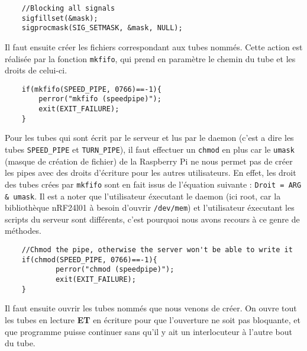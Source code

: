 \begin{DDbox}{\linewidth}
\begin{lstlisting}
	//Blocking all signals
	sigfillset(&mask);
	sigprocmask(SIG_SETMASK, &mask, NULL);
\end{lstlisting}
\end{DDbox}

Il faut ensuite créer les fichiers correspondant aux tubes nommés. Cette action
est réalisée par la fonction \texttt{mkfifo}, qui prend en paramètre le chemin
du tube et les droits de celui-ci. \\

\begin{DDbox}{\linewidth}
\begin{lstlisting}
	if(mkfifo(SPEED_PIPE, 0766)==-1){
		perror("mkfifo (speedpipe)");
		exit(EXIT_FAILURE);
	}
\end{lstlisting}
\end{DDbox}

Pour les tubes qui sont écrit par le serveur et lus par le daemon (c'est a dire
les tubes \texttt{SPEED\_PIPE} et \texttt{TURN\_PIPE}), il faut effectuer un 
\texttt{chmod} en plus car le \texttt{umask} (masque de création de fichier) 
de la Raspberry Pi ne nous permet pas de créer les pipes avec des droits 
d'écriture pour les autres utilisateurs. En effet, les droit des tubes 
crées par \texttt{mkfifo} sont en fait issus de l'équation suivante : 
\texttt{Droit = ARG \& umask}. Il est a noter que l'utilisateur éxecutant le 
daemon (ici root, car la bibliothèque nRF24l01 à besoin d'ouvrir
\texttt{/dev/mem}) et l'utilisateur éxecutant les scripts du serveur sont
différents, c'est pourquoi nous avons recours à ce genre de méthodes. \\

\begin{DDbox}{\linewidth}
\begin{lstlisting}
	//Chmod the pipe, otherwise the server won't be able to write it
	if(chmod(SPEED_PIPE, 0766)==-1){
	        perror("chmod (speedpipe)");
	        exit(EXIT_FAILURE);
	}
\end{lstlisting}
\end{DDbox}

Il faut ensuite ouvrir les tubes nommés que nous venons de créer. On ouvre
tout les tubes en lecture \textbf{ET} en écriture pour que l'ouverture ne soit
pas bloquante, et que programme puisse continuer sans qu'il y ait un 
interlocuteur à l'autre bout du tube. \\

